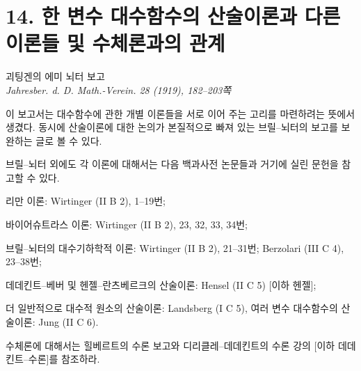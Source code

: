 
\section*{14. 한 변수 대수함수의 산술이론과 다른 이론들 및 수체론과의 관계}

\begin{center}
괴팅겐의 에미 뇌터 보고\\[0.6em]
\emph{Jahresber. d. D. Math.-Verein. 28 (1919), 182--203쪽}
\end{center}

이 보고서는 대수함수에 관한 개별 이론들을 서로 이어 주는 고리를 마련하려는 뜻에서 생겼다. 동시에 산술이론에 대한 논의가 본질적으로 빠져 있는 브릴--뇌터의 보고를 보완하는 글로 볼 수 있다.

브릴--뇌터 외에도 각 이론에 대해서는 다음 백과사전 논문들과 거기에 실린 문헌을 참고할 수 있다.

리만 이론: Wirtinger (II B 2), 1--19번;

바이어슈트라스 이론: Wirtinger (II B 2), 23, 32, 33, 34번;

브릴--뇌터의 대수기하학적 이론: Wirtinger (II B 2), 21--31번; Berzolari (III C 4), 23--38번;

데데킨트--베버 및 헨젤--란츠베르크의 산술이론: Hensel (II C 5) [이하 헨젤];

더 일반적으로 대수적 원소의 산술이론: Landsberg (I C 5), 여러 변수 대수함수의 산술이론: Jung (II C 6).

수체론에 대해서는 힐베르트의 \glqq{}수론 보고\grqq{}와 디리클레--데데킨트의 수론 강의 [이하 데데킨트--수론]를 참조하라.


